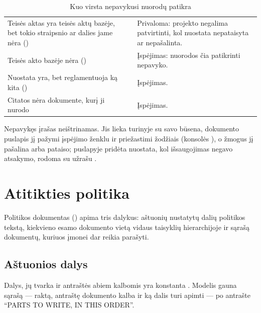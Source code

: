\begin{table}[H]
\caption{Kuo virsta nepavykusi nuorodų patikra}\label{tab:programme:references}
\begin{tabularx}{\textwidth}{@{}L{47mm}L{41mm}Y@{}}
\toprule
{} &  &  \\
\midrule
Teisės aktas yra teisės aktų bazėje, bet tokio straipsnio ar dalies jame nėra () &  & Privaloma: projekto negalima patvirtinti, kol nuostata nepataisyta ar nepašalinta. \\
Teisės akto bazėje nėra () &  & Įspėjimas: nuorodos čia patikrinti nepavyko. \\
Nuostata yra, bet reglamentuoja ką kita () &  & Įspėjimas. \\
Citatos nėra dokumente, kurį ji nurodo &  & Įspėjimas. \\
\bottomrule
\end{tabularx}
\end{table}

Nepavykęs įrašas neištrinamas. Jis lieka turinyje su savo būsena, dokumento puslapis jį
pažymi įspėjimo ženklu ir priežastimi žodžiais (konsolės
), o žmogus jį pašalina arba pataiso; puslapyje
pridėta nuostata, kol išsaugojimas negavo atsakymo, rodoma su užrašu
.


\section{Atitikties politika}\label{sec:programme:policy}

Politikos dokumentas () apima tris dalykus: aštuonių nustatytų dalių
politikos tekstą, kiekvieno esamo dokumento vietą vidaus taisyklių hierarchijoje ir sąrašą
dokumentų, kuriuos įmonei dar reikia parašyti.

\subsection{Aštuonios dalys}

Dalys, jų tvarka ir antraštės abiem kalbomis yra konstanta . Modelis gauna sąrašą
--- raktą, antraštę dokumento kalba ir ką dalis turi apimti --- po antrašte
\enquote{PARTS TO WRITE, IN THIS ORDER}.

